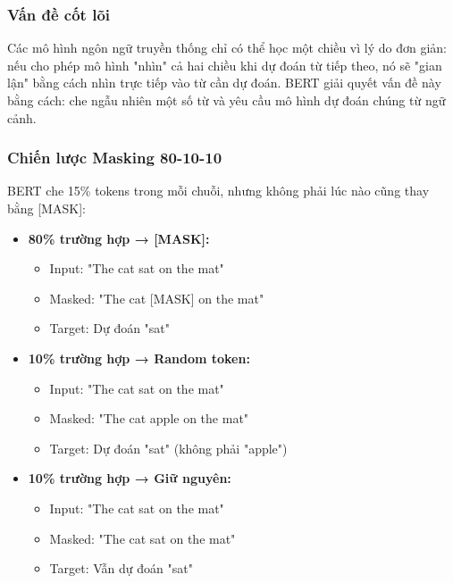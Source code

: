 \subsubsection{Vấn đề cốt lõi}
Các mô hình ngôn ngữ truyền thống chỉ có thể học một chiều vì lý do đơn giản: nếu cho phép mô hình "nhìn" cả hai chiều khi dự đoán từ tiếp theo, nó sẽ "gian lận" bằng cách nhìn trực tiếp vào từ cần dự đoán. BERT giải quyết vấn đề này bằng cách: che ngẫu nhiên một số từ và yêu cầu mô hình dự đoán chúng từ ngữ cảnh.

\subsubsection{Chiến lược Masking 80-10-10}
BERT che 15\% tokens trong mỗi chuỗi, nhưng không phải lúc nào cũng thay bằng [MASK]:

\begin{itemize}
    \item \textbf{80\% trường hợp → [MASK]:} 
    \begin{itemize}
        \item Input: "The cat sat on the mat"
        \item Masked: "The cat [MASK] on the mat"
        \item Target: Dự đoán "sat"
    \end{itemize}
    
    \item \textbf{10\% trường hợp → Random token:}
    \begin{itemize}
        \item Input: "The cat sat on the mat"
        \item Masked: "The cat apple on the mat"
        \item Target: Dự đoán "sat" (không phải "apple")
    \end{itemize}
    
    \item \textbf{10\% trường hợp → Giữ nguyên:}
    \begin{itemize}
        \item Input: "The cat sat on the mat"
        \item Masked: "The cat sat on the mat"
        \item Target: Vẫn dự đoán "sat"
    \end{itemize}
\end{itemize}

